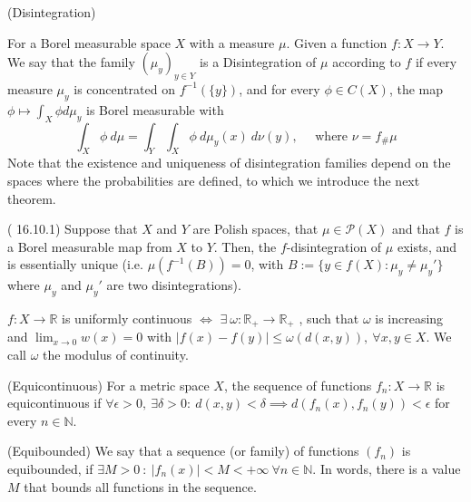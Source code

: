\begin{definition}(Disintegration)

	For a Borel measurable space $X$ with a measure $\mu$.
	Given a function $f:X \to Y$. We say that the family
	$(\mu_y)_{y\in Y}$ is a Disintegration of $\mu$ according
	to $f$ if every measure $\mu_y$ is concentrated on $f^{-1}(\{y\})$, and
	for every $\phi \in C(X)$, the map $\phi \mapsto \int_X \phi d \mu_y$ is
	Borel measurable with
	\begin{equation}
		\int_X \phi \ d\mu = \int_Y \int_X \phi \ d\mu_y (x) \ d\nu(y), \quad
		\text{ where } \nu = f_\# \mu
	\end{equation}
	Note that the existence and uniqueness of disintegration families depend on the
	spaces where the probabilities are defined, to which we introduce the next theorem.
	\label{def:disintegration}
\end{definition}

\begin{theorem}(\citet{garling2018analysis} 16.10.1)
	Suppose that $X$ and $Y$ are Polish spaces, that $\mu \in \mathcal P(X)$ and that
	$f$ is a Borel measurable map from $X$ to $Y$. Then, the $f$-disintegration
	of $\mu$ exists, and is essentially unique (i.e.
	$\mu(f^{-1}(B))=0$, with
	$B := \{y \in f(X) : \mu_y \neq \mu_y'\}$ where $\mu_y$ and $\mu_y'$ are two disintegrations).
	\label{thm:disintegrationunique}
\end{theorem}

\begin{theorem}
	$f:X \to \mathbb R$ is uniformly continuous $\iff$
	$\exists \ \omega : \mathbb R_+ \to \mathbb R_+$ , such that
	$\omega$ is increasing and $\lim_{x \to 0} w(x) = 0$ with
	$|f(x) - f(y)| \leq \omega(d(x,y)), \ \forall x,y \in X$.
	We call $\omega$ the modulus of continuity.
	\label{thm:mod_continuity}
\end{theorem}

\begin{definition}(Equicontinuous)
	For a metric space $X$, the sequence of functions
	$f_n:X\to \mathbb R$ is equicontinuous if
	$\forall \epsilon >0,\ \exists \delta >0: \ d(x,y) < \delta
		\implies d(f_n(x),f_n(y))<\epsilon$ for every $n \in \mathbb N$.
	\label{def:equicontinuous}
\end{definition}

\begin{definition}(Equibounded) We say that a sequence (or family)
	of functions $(f_n)$ is equibounded,
	if $\exists M > 0 \ : \ |f_n(x)|< M < +\infty \ \forall n \in
		\mathbb N$. In words, there is a value $M$ that bounds all functions
	in the sequence.
	\label{def:equibounded}
\end{definition}

